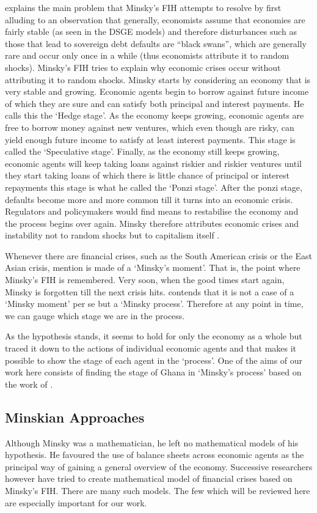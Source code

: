 \documentclass[12pt, a4paper]{article}
\begin{document}
	 explains the main problem that Minsky's FIH attempts to resolve by first alluding to an observation that generally, economists assume that economies are fairly stable (as seen in the DSGE models) and therefore disturbances such as those that lead to sovereign debt defaults are ``black swans'', which are generally rare and occur only once in a while (thus economists attribute it to random shocks). Minsky's FIH tries to explain why economic crises occur without attributing it to random shocks. Minsky starts by considering an economy that is very stable and growing. Economic agents begin to borrow against future income of which they are sure and can satisfy both principal and interest payments. He calls this the `Hedge stage'. As the economy keeps growing, economic agents are free to borrow money against new ventures, which even though are risky, can yield enough future income to satisfy at least interest payments. This stage is called the `Speculative stage'. Finally, as the economy still keeps growing, economic agents will keep taking loans against riskier and riskier ventures until they start taking loans of which there is little chance of principal or interest repayments this stage is what he called the `Ponzi stage'. After the ponzi stage, defaults become more and more common till it turns into an economic crisis. Regulators and policymakers would find means to restabilise the economy and the process begins over again. Minsky therefore attributes economic crises and instability not to random shocks but to capitalism itself \cite{minsky2016can}.
	
	Whenever there are financial crises, such as the South American crisis or the East Asian crisis, mention is made of a `Minsky's moment'. That is, the point where Minsky's FIH is remembered. Very soon, when the good times start again, Minsky is forgotten till the next crisis hits.  contends that it is not a case of a `Minsky moment' per se but a `Minsky process'. Therefore at any point in time, we can gauge which stage we are in the process.
	
	As the hypothesis stands, it seems to hold for only the economy as a whole but  traced it down to the actions of individual economic agents and that makes it possible to show the stage of each agent in the `process'. One of the aims of our work here consists of finding the stage of Ghana in `Minsky's process' based on the work of .
	\subsection{Minskian Approaches}
	Although Minsky was a mathematician, he left no mathematical models of his hypothesis. He favoured the use of balance sheets across economic agents as the principal way of gaining a general overview of the economy. Successive researchers however have tried to create mathematical model of financial crises based on Minsky's FIH. There are many such models. The few which will be reviewed here are especially important for our work.
	
\end{document}
